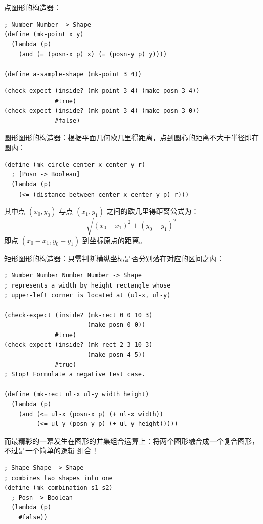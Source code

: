 点图形的构造器：
\begin{lstlisting}[language=BSL]
; Number Number -> Shape
(define (mk-point x y)
  (lambda (p)
    (and (= (posn-x p) x) (= (posn-y p) y))))

(define a-sample-shape (mk-point 3 4))
\end{lstlisting}

\begin{lstlisting}[language=BSL]
(check-expect (inside? (mk-point 3 4) (make-posn 3 4))
              #true)
(check-expect (inside? (mk-point 3 4) (make-posn 3 0))
              #false)
\end{lstlisting}

圆形图形的构造器：根据平面几何欧几里得距离，点到圆心的距离不大于半径即在圆内：

\begin{lstlisting}[language=BSL]
(define (mk-circle center-x center-y r)
  ; [Posn -> Boolean]
  (lambda (p)
    (<= (distance-between center-x center-y p) r)))
\end{lstlisting}

\par 其中点 $(x_0, y_0)$ 与点 $(x_1, y_1)$ 之间的欧几里得距离公式为：
\[
  \sqrt{(x_0 - x_1)^2 + (y_0 - y_1)^2}
\]
即点 $(x_0 - x_1, y_0 - y_1)$ 到坐标原点的距离。

矩形图形的构造器：只需判断横纵坐标是否分别落在对应的区间之内：

\begin{lstlisting}[language=BSL]
; Number Number Number Number -> Shape
; represents a width by height rectangle whose
; upper-left corner is located at (ul-x, ul-y)

(check-expect (inside? (mk-rect 0 0 10 3)
                       (make-posn 0 0))
              #true)
(check-expect (inside? (mk-rect 2 3 10 3)
                       (make-posn 4 5))
              #true)
; Stop! Formulate a negative test case.

(define (mk-rect ul-x ul-y width height)
  (lambda (p)
    (and (<= ul-x (posn-x p) (+ ul-x width))
         (<= ul-y (posn-y p) (+ ul-y height)))))
\end{lstlisting}

而最精彩的一幕发生在图形的并集组合运算上：将两个图形融合成一个复合图形，不过是一个简单的逻辑  组合！

\begin{lstlisting}[language=BSL]
; Shape Shape -> Shape
; combines two shapes into one
(define (mk-combination s1 s2)
  ; Posn -> Boolean
  (lambda (p)
    #false))
\end{lstlisting}

